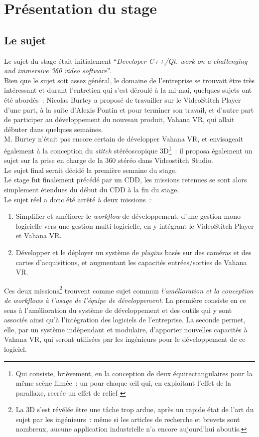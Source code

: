 \chapter{Présentation du stage}

\section{Le sujet}
\label{le-sujet}
Le sujet du stage était initialement \enquote{\textit{Developer C++/Qt.
work on a challenging and immersive 360 video software}}.\\
Bien que le sujet soit assez général, le domaine de l'entreprise se trouvait être très intéressant
et durant l'entretien qui s'est déroulé à la mi-mai, quelques sujets ont été
abordés~: Nicolas Burtey a proposé de travailler sur le VideoStitch Player d'une part,
à la suite d'Alexis Pontin et pour terminer son travail, et d'autre part de participer
au développement du nouveau produit,
Vahana VR, qui allait débuter dans quelques semaines.\\
M. Burtey n'était pas encore certain de développer Vahana VR, 
et envisageait également à la conception du \textit{stitch} stéréoscopique 3D\footnote{Qui
consiste, brièvement, en la conception de deux équirectangulaires pour la même
scène filmée~: un pour chaque œil qui, en exploitant l'effet de la parallaxe, recrée 
un effet de relief\cite{videostitch-stereo}
\cite{image-stereoscopique}}~: il proposa également un sujet sur 
la prise en charge de la 360 stéréo dans Videostitch Studio.\\
Le sujet final serait décidé la première semaine du stage.\\
\newline
Le stage fut finalement précédé par un CDD, les missions retenues
se sont alors simplement étendues du début du CDD à la fin du stage.\\
Le sujet réel a donc été arrêté à deux missions~:
\begin{enumerate}
  \item Simplifier et améliorer le \textit{workflow} de développement, d'une
  gestion mono-logicielle vers une gestion multi-logicielle, en y intégrant 
  le VideoStitch Player et Vahana VR.
  \item Développer et le déployer un système de \textit{plugins} basés
  sur des caméras et des cartes d'acquisitions, et augmentant les
  capacités entrées/sorties de Vahana VR.
\end{enumerate}
Ces deux missions\footnote{La 3D s'est révélée être 
une tâche trop ardue, après un rapide état de l'art du sujet par les ingénieurs~: 
même si les articles de recherche et brevets sont nombreux, aucune application 
industrielle n'a encore aujourd'hui aboutis.} trouvent comme sujet commun \emph{l'amélioration et la conception 
de \textit{workflows} à l'usage de l'équipe de développement}. La première consiste en 
ce sens à l'amélioration du système de développement et des outils qui y sont associés ainsi qu'à l'intégration des logiciels
de l'entreprise. La seconde permet, elle, par un système indépendant et modulaire, d'apporter
nouvelles capacités à Vahana VR, qui seront utilisées par les ingénieurs pour le développement de ce logiciel.

